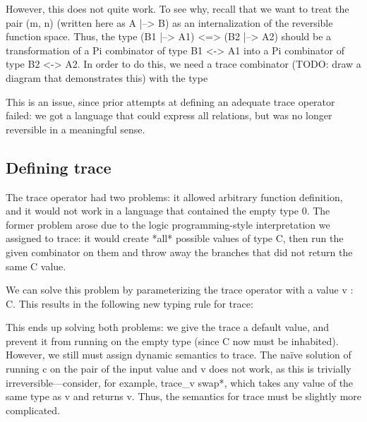 \documentclass{sigplanconf}
\begin{document}

\noindent
However, this does not quite work. To see why, recall that we want to treat the
pair {{(m, n)}} (written here as {{A |--> B}}) as an internalization of the
reversible function space. Thus, the type {{(B1 |--> A1) <=> (B2 |--> A2)}}
should be a transformation of a {{Pi}} combinator of type {{B1 <-> A1}} into a
{{Pi}} combinator of type {{B2 <-> A2}}. In order to do this, we need a trace
combinator (TODO: draw a diagram that demonstrates this) with the type


\noindent
This is an issue, since prior attempts at defining an adequate trace operator
failed: we got a language that could express all relations, but was no longer
reversible in a meaningful sense.

\subsection{Defining trace}

The trace operator had two problems: it allowed arbitrary function definition,
and it would not work in a language that contained the empty type {{0}}. The
former problem arose due to the logic programming-style interpretation we
assigned to trace: it would create *all* possible values of type {{C}}, then run
the given combinator on them and throw away the branches that did not return the
same {{C}} value.

We can solve this problem by parameterizing the trace operator with a value {{v
: C}}. This results in the following new typing rule for trace:


\noindent
This ends up solving both problems: we give the trace a default value, and
prevent it from running on the empty type (since {{C}} now must be inhabited).
However, we still must assign dynamic semantics to trace. The na\"ive solution
of running {{c}} on the pair of the input value and {{v}} does not work, as this
is trivially irreversible---consider, for example, {{trace_v swap*}}, which
takes any value of the same type as {{v}} and returns {{v}}. Thus, the semantics
for {{trace}} must be slightly more complicated.
\end{document}
